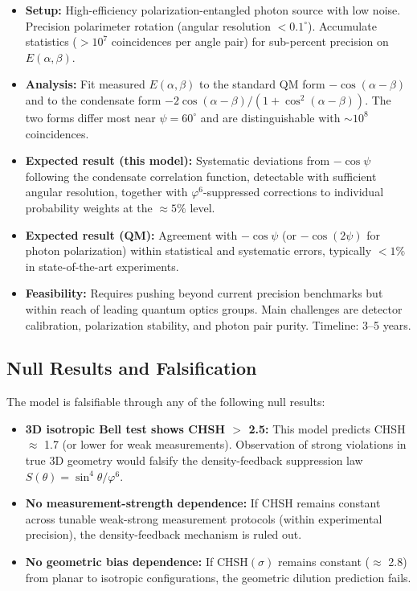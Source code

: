 \documentclass[11pt,a4paper]{article}
\theoremstyle{definition}
\theoremstyle{remark}
\newcommand{\vp}{\varphi}
\begin{document}
\begin{itemize}
\item \textbf{Setup:} High-efficiency polarization-entangled photon source with low noise. Precision polarimeter rotation (angular resolution $< 0.1^\circ$). Accumulate statistics ($> 10^7$ coincidences per angle pair) for sub-percent precision on $E(\alpha, \beta)$.

\item \textbf{Analysis:} Fit measured $E(\alpha, \beta)$ to the standard QM form $-\cos(\alpha - \beta)$ and to the condensate form $-2\cos(\alpha-\beta)/(1+\cos^2(\alpha-\beta))$. The two forms differ most near $\psi = 60^\circ$ and are distinguishable with $\sim 10^8$ coincidences.

\item \textbf{Expected result (this model):} Systematic deviations from $-\cos\psi$ following the condensate correlation function, detectable with sufficient angular resolution, together with $\vp^6$-suppressed corrections to individual probability weights at the $\approx 5\%$ level.

\item \textbf{Expected result (QM):} Agreement with $-\cos\psi$ (or $-\cos(2\psi)$ for photon polarization) within statistical and systematic errors, typically $< 1\%$ in state-of-the-art experiments.

\item \textbf{Feasibility:} Requires pushing beyond current precision benchmarks but within reach of leading quantum optics groups. Main challenges are detector calibration, polarization stability, and photon pair purity. Timeline: 3--5 years.
\end{itemize}

\subsection{Null Results and Falsification}

The model is falsifiable through any of the following null results:

\begin{itemize}
\item \textbf{3D isotropic Bell test shows CHSH $>$ 2.5:} This model predicts CHSH $\approx$ 1.7 (or lower for weak measurements). Observation of strong violations in true 3D geometry would falsify the density-feedback suppression law $S(\theta)=\sin^4\!\theta/\vp^6$.

\item \textbf{No measurement-strength dependence:} If CHSH remains constant across tunable weak-strong measurement protocols (within experimental precision), the density-feedback mechanism is ruled out.

\item \textbf{No geometric bias dependence:} If CHSH$(\sigma)$ remains constant ($\approx$ 2.8) from planar to isotropic configurations, the geometric dilution prediction fails.

\end{itemize}
\end{document}
